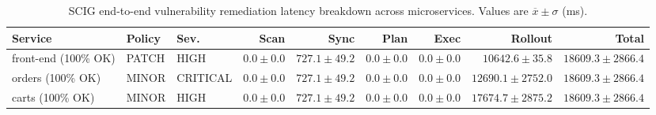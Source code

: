 \begin{table}[htbp]
\centering
\caption{SCIG end-to-end vulnerability remediation latency breakdown across microservices. Values are $\overline{x} \pm \sigma$ (ms).}
\label{tab:scig_s2_remediation}
\begin{tabular}{lllrrrrrr}
\toprule
\textbf{Service} & \textbf{Policy} & \textbf{Sev.} & \textbf{Scan} & \textbf{Sync} & \textbf{Plan} & \textbf{Exec} & \textbf{Rollout} & \textbf{Total} \\
\midrule
front-end (100\% OK) & PATCH & HIGH & $0.0 \pm 0.0$ & $727.1 \pm 49.2$ & $0.0 \pm 0.0$ & $0.0 \pm 0.0$ & $10642.6 \pm 35.8$ & $18609.3 \pm 2866.4$ \\
orders (100\% OK) & MINOR & CRITICAL & $0.0 \pm 0.0$ & $727.1 \pm 49.2$ & $0.0 \pm 0.0$ & $0.0 \pm 0.0$ & $12690.1 \pm 2752.0$ & $18609.3 \pm 2866.4$ \\
carts (100\% OK) & MINOR & HIGH & $0.0 \pm 0.0$ & $727.1 \pm 49.2$ & $0.0 \pm 0.0$ & $0.0 \pm 0.0$ & $17674.7 \pm 2875.2$ & $18609.3 \pm 2866.4$ \\
\bottomrule
\end{tabular}
\end{table}
